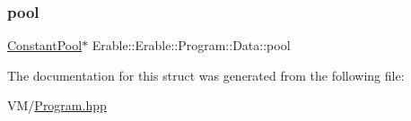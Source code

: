 \subsubsection{\texorpdfstring{pool}{pool}}
{\footnotesize\ttfamily \mbox{\hyperlink{class_erable_1_1_constant_pool}{Constant\+Pool}}$\ast$ Erable\+::\+Erable\+::\+Program\+::\+Data\+::pool}



The documentation for this struct was generated from the following file\+:\begin{DoxyCompactItemize}
\item 
V\+M/\mbox{\hyperlink{_program_8hpp}{Program.\+hpp}}\end{DoxyCompactItemize}
